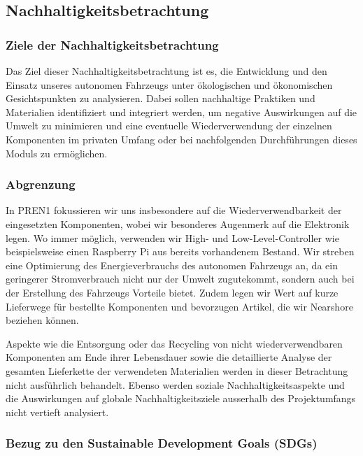 \documentclass[../../main.tex]{subfiles} %
\begin{document}
\subsection{Nachhaltigkeitsbetrachtung}

\subsubsection{Ziele der Nachhaltigkeitsbetrachtung}

Das Ziel dieser Nachhaltigkeitsbetrachtung ist es, die Entwicklung
und den Einsatz unseres autonomen Fahrzeugs unter ökologischen und
ökonomischen Gesichtspunkten zu analysieren. Dabei sollen nachhaltige
Praktiken und Materialien identifiziert und integriert werden, um
negative Auswirkungen auf die Umwelt zu minimieren und eine
eventuelle Wiederverwendung der einzelnen Komponenten im privaten
Umfang oder bei nachfolgenden Durchführungen dieses Moduls zu ermöglichen.

\subsubsection{Abgrenzung}

In PREN1 fokussieren wir uns insbesondere auf die
Wiederverwendbarkeit der eingesetzten Komponenten, wobei wir
besonderes Augenmerk auf die Elektronik legen. Wo immer möglich,
verwenden wir High- und Low-Level-Controller wie beispielsweise einen
Raspberry Pi aus bereits vorhandenem Bestand. Wir streben eine
Optimierung des Energieverbrauchs des autonomen Fahrzeugs an, da ein
geringerer Stromverbrauch nicht nur der Umwelt zugutekommt, sondern
auch bei der Erstellung des Fahrzeugs Vorteile bietet. Zudem legen
wir Wert auf kurze Lieferwege für bestellte Komponenten und
bevorzugen Artikel, die wir Nearshore beziehen können.

Aspekte wie die Entsorgung oder das Recycling von nicht
wiederverwendbaren Komponenten am Ende ihrer Lebensdauer
sowie die detaillierte Analyse der gesamten Lieferkette der
verwendeten Materialien werden in dieser Betrachtung nicht
ausführlich behandelt. Ebenso werden soziale Nachhaltigkeitsaspekte
und die Auswirkungen auf globale Nachhaltigkeitsziele ausserhalb des
Projektumfangs nicht vertieft analysiert.

\subsubsection{Bezug zu den Sustainable Development Goals (SDGs)}
\end{document}
